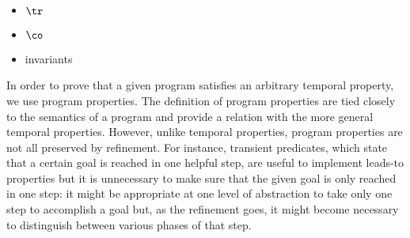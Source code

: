 \begin{itemize}
\item $\tr$
\item $\co$
\item invariants
\end{itemize}

In order to prove that a given program satisfies an arbitrary temporal property, we use program properties.  The definition of program properties are tied closely to the semantics of a program and provide a relation with the more general temporal properties.  However, unlike temporal properties, program properties are not all preserved by refinement.  For instance, transient predicates, which state that a certain goal is reached in one helpful step, are useful to implement leads-to properties but it is unnecessary to make sure that the given goal is only reached in one step: it might be appropriate at one level of abstraction to take only one step to accomplish a goal but, as the refinement goes, it might become necessary to distinguish between various phases of that step.

